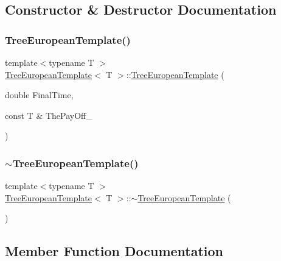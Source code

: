 \subsection{Constructor \& Destructor Documentation}
\hypertarget{classTreeEuropeanTemplate_a843c2ede088f0a9a720746dcbbf32b39}{}\label{classTreeEuropeanTemplate_a843c2ede088f0a9a720746dcbbf32b39} 
\subsubsection{\texorpdfstring{Tree\+European\+Template()}{TreeEuropeanTemplate()}}
{\footnotesize\ttfamily template$<$typename T $>$ \\
\hyperlink{classTreeEuropeanTemplate}{Tree\+European\+Template}$<$ T $>$\+::\hyperlink{classTreeEuropeanTemplate}{Tree\+European\+Template} (\begin{DoxyParamCaption}\item[{double}]{Final\+Time,  }\item[{const T \&}]{The\+Pay\+Off\+\_\+ }\end{DoxyParamCaption})}

\hypertarget{classTreeEuropeanTemplate_a20ac647ce669c800b70cfc7102678b95}{}\label{classTreeEuropeanTemplate_a20ac647ce669c800b70cfc7102678b95} 
\subsubsection{\texorpdfstring{$\sim$\+Tree\+European\+Template()}{~TreeEuropeanTemplate()}}
{\footnotesize\ttfamily template$<$typename T $>$ \\
\hyperlink{classTreeEuropeanTemplate}{Tree\+European\+Template}$<$ T $>$\+::$\sim$\hyperlink{classTreeEuropeanTemplate}{Tree\+European\+Template} (\begin{DoxyParamCaption}{ }\end{DoxyParamCaption})\hspace{0.3cm}{\ttfamily [inline]}}



\subsection{Member Function Documentation}
\hypertarget{classTreeEuropeanTemplate_ab295adeefbb84f93854f07f511742ae7}{}\label{classTreeEuropeanTemplate_ab295adeefbb84f93854f07f511742ae7} 
